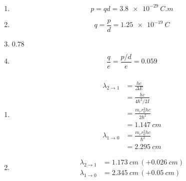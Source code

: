 \documentclass{article}
\begin{document}
\setcounter{subsubsection}{34}
\subsubsection{}

\begin{enumerate}
  \item \[p = q d = \qty{3.8e-29}{C.m}\]

  \item \[q = \frac{p}{d} = \qty{1.25e-19}{C}\]

  \item $0.78$

  \item \[\frac{q}{e} = \frac{p / d}{e} = 0.059\]
\end{enumerate}

\setcounter{subsubsection}{40}
\subsubsection{}

\begin{enumerate}
  \item

        \begin{align*}
          \lambda_{2 \rightarrow 1} & = \frac{h c}{\Delta E}            \\
                                    & = \frac{h c}{4 \hbar^2 / 2 I}     \\
                                    & = \frac{m_r r_0^2 h c}{2 \hbar^2} \\
                                    & = \qty{1.147}{cm}                 \\
          \lambda_{1 \rightarrow 0} & = \frac{m_r r_0^2 h c}{\hbar^2}   \\
                                    & = \qty{2.295}{cm}
        \end{align*}

  \item

        \begin{align*}
          \lambda_{2 \rightarrow 1} & = \qty{1.173}{cm} \,(+\qty{0.026}{cm}) \\
          \lambda_{1 \rightarrow 0} & = \qty{2.345}{cm} \,(+\qty{0.05}{cm})
        \end{align*}
\end{enumerate}

\setcounter{subsubsection}{42}
\subsubsection{}
\end{document}
